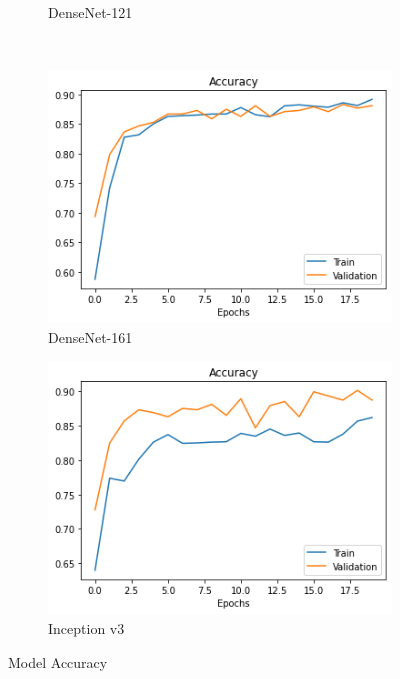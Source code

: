\documentclass{article}
\begin{document}
\begin{figure}[H]
\begin{subfigure}[b]{0.30\textwidth}
            \caption{DenseNet-121}
            \label{DenseNet-121}
    \end{subfigure} \\
    \begin{subfigure}[b]{0.30\textwidth}
            \centering
            \includegraphics[width=.85\linewidth]{images/densenet161_acc}
            \caption{DenseNet-161}
            \label{DenseNet-161}
    \end{subfigure}%
    \begin{subfigure}[b]{0.30\textwidth}
            \centering
            \includegraphics[width=.85\linewidth]{images/inceptionv3_acc.png}
            \caption{Inception v3}
            \label{Inception v3}
    \end{subfigure}
    \caption{Model Accuracy}\label{fig:animals}
\end{figure}
\end{document}

